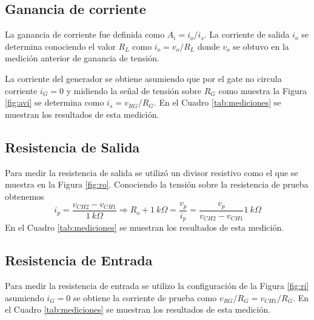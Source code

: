 \documentclass[a4paper, 10pt, spanish]{article}
\begin{document}
\subsection{Ganancia de corriente}

La ganancia de corriente fue definida como $A_i = i_o/ i_s$. La corriente de salida $i_o$ se determina conociendo el valor $R_L$ como $i_o = v_o/R_L$ donde $v_o$ se obtuvo en la medición anterior de ganancia de tensión.


La corriente del generador se obtiene asumiendo que por el gate no circula corriente $i_G = 0$ y midiendo la señal de tensión sobre $R_G$ como muestra la Figura \ref{fig:avi} se determina como $i_s = v_{RG}/R_G$. En el Cuadro \ref{tab:mediciones} se muestran los resultados de esta medición.

\subsection{Resistencia de Salida}

Para medir la resistencia de salida se utilizó un divisor resistivo como el que se muestra en la Figura \ref{fig:ro}. Conociendo la tensión sobre la resistencia de prueba obtenemos
\begin{equation}
	i_p = \frac{v_{CH2}-v_{CH1}}{1\ k\Omega} \Rightarrow R_o + 1\ k\Omega = \frac{v_p}{i_p} = \frac{v_p}{v_{CH2}-v_{CH1}}1\ k\Omega
	\end{equation}
En el Cuadro \ref{tab:mediciones} se muestran los resultados de esta medición.

\subsection{Resistencia de Entrada}

Para medir la resistencia de entrada se utilizo la configuración de la Figura \ref{fig:ri} asumiendo $i_G = 0$ se obtiene la corriente de prueba como $v_{RG}/R_G = v_{CH1}/R_G$.
En el Cuadro \ref{tab:mediciones} se muestran los resultados de esta medición.
\end{document}
